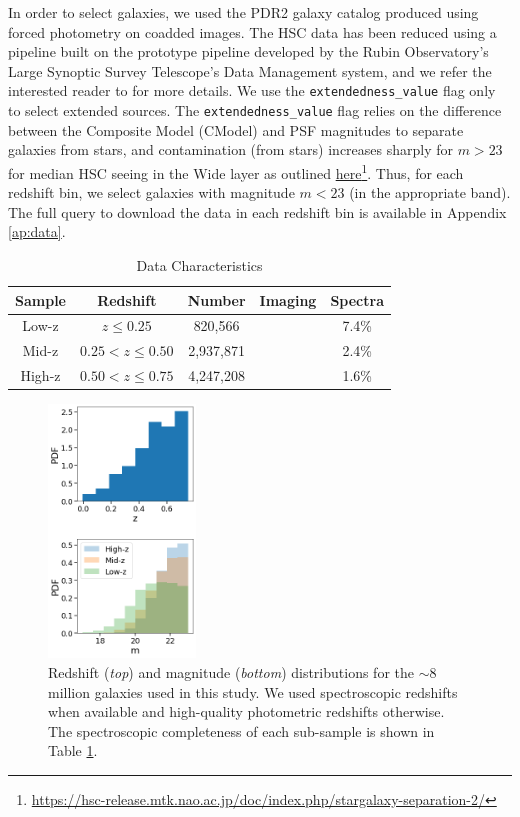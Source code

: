 In order to select galaxies, we used the PDR2 galaxy catalog produced using forced photometry on coadded images. The HSC data has been reduced using a pipeline built on the prototype pipeline developed by the Rubin Observatory's Large Synoptic Survey Telescope's Data Management system, and we refer the interested reader to \citet{hsc_pipeline} for more details. We use the \texttt{extendedness\_value} flag only to select extended sources. The \texttt{extendedness\_value} flag relies on the difference between the Composite Model (CModel) and PSF magnitudes to separate galaxies from stars, and contamination (from stars) increases sharply for $m > 23$ for median HSC seeing in the Wide layer as outlined \href{https://hsc-release.mtk.nao.ac.jp/doc/index.php/stargalaxy-separation-2/}{here}\footnote{\href{https://hsc-release.mtk.nao.ac.jp/doc/index.php/stargalaxy-separation-2/}{https://hsc-release.mtk.nao.ac.jp/doc/index.php/stargalaxy-separation-2/}}. Thus, for each redshift bin, we  select galaxies with magnitude $m < 23$ (in the appropriate band). The full query to download the data in each redshift bin is available in Appendix \ref{ap:data}.

\begin{table}[htbp]
\centering
\caption{Data Characteristics  \label{tab_c3:data}}
\begin{tabular}{ccccc}
\hline
\hline
Sample & Redshift & Number & Imaging & Spectra \\
\hline
    \hline
    Low-z & $z\leq0.25$ & 820,566 & \gb{} & 7.4\% \\
    Mid-z & $0.25 < z\leq0.50$ & 2,937,871 & \rb{} & 2.4\% \\
    High-z & $0.50 < z\leq0.75$ & 4,247,208 & \ib{} & 1.6\% \\
\hline
\end{tabular}
\end{table}

\begin{figure}[htb]
    \centering
    \includegraphics[width = 0.35\textwidth]{z_mag_distr.png}
    \caption{Redshift ({\it top}) and magnitude ({\it bottom}) distributions for the $\sim8$ million galaxies used in this study.
    We used spectroscopic redshifts when available and high-quality photometric redshifts otherwise. The spectroscopic completeness
    of each sub-sample is shown in Table \ref{tab_c3:data}.}
    \label{fig_c3:z_mag_distr}
\end{figure}

